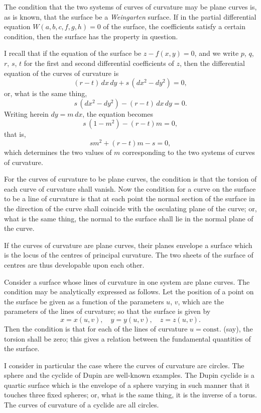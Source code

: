 \documentclass[11pt,a4paper]{article}
\theoremstyle{plain}
\theoremstyle{definition}
\begin{document}
The condition that the two systems of curves of curvature may be plane curves is, as is known, that the surface be a \textit{Weingarten} surface. If in the partial differential equation $W(a,b,c,f,g,h)=0$ of the surface, the coefficients satisfy a certain condition, then the surface has the property in question.

I recall that if the equation of the surface be $z - f(x,y) = 0$, and we write $p$, $q$, $r$, $s$, $t$ for the first and second differential coefficients of $z$, then the differential equation of the curves of curvature is
\[ (r-t)\,dx\,dy + s\,(dx^2 - dy^2) = 0, \]
or, what is the same thing,
\[ s\,(dx^2 - dy^2) - (r-t)\,dx\,dy = 0. \]
Writing herein $dy = m\,dx$, the equation becomes
\[ s\,(1-m^2) - (r-t)m = 0, \]
that is,
\[ sm^2 + (r-t)m - s = 0, \]
which determines the two values of $m$ corresponding to the two systems of curves of curvature.

For the curves of curvature to be plane curves, the condition is that the torsion of each curve of curvature shall vanish. Now the condition for a curve on the surface to be a line of curvature is that at each point the normal section of the surface in the direction of the curve shall coincide with the osculating plane of the curve; or, what is the same thing, the normal to the surface shall lie in the normal plane of the curve.

If the curves of curvature are plane curves, their planes envelope a surface which is the locus of the centres of principal curvature. The two sheets of the surface of centres are thus developable upon each other.

Consider a surface whose lines of curvature in one system are plane curves. The condition may be analytically expressed as follows. Let the position of a point on the surface be given as a function of the parameters $u$, $v$, which are the parameters of the lines of curvature; so that the surface is given by
\[ x = x(u,v),\quad y = y(u,v),\quad z = z(u,v). \]
Then the condition is that for each of the lines of curvature $u = \text{const.}$ (say), the torsion shall be zero; this gives a relation between the fundamental quantities of the surface.

I consider in particular the case where the curves of curvature are circles. The sphere and the cyclide of Dupin are well-known examples. The Dupin cyclide is a quartic surface which is the envelope of a sphere varying in such manner that it touches three fixed spheres; or, what is the same thing, it is the inverse of a torus. The curves of curvature of a cyclide are all circles.
\end{document}
